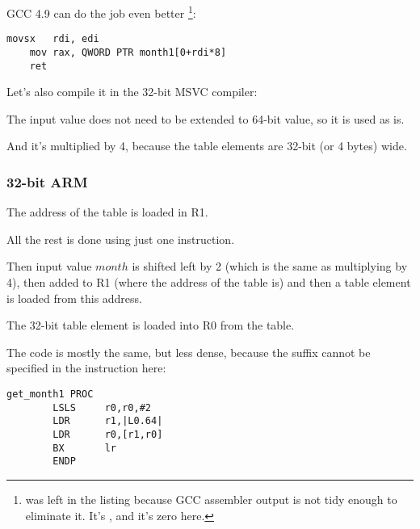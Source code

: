 \Optimizing GCC 4.9 can do the job even better
\footnote{ was left in the listing because GCC assembler output is not tidy enough to eliminate it.
It's , and it's zero here.}:

\begin{lstlisting}[caption=\Optimizing GCC 4.9 x64,style=customasmx86]
	movsx	rdi, edi
	mov	rax, QWORD PTR month1[0+rdi*8]
	ret
\end{lstlisting}


Let's also compile it in the 32-bit MSVC compiler:



The input value does not need to be extended to 64-bit value, so it is used as is.

And it's multiplied by 4, because the table elements are 32-bit (or 4 bytes) wide.

\subsubsection{32-bit ARM}





The address of the table is loaded in R1.

All the rest is done using just one \LDR instruction.

Then input value $month$ is shifted left by 2 (which is the same as multiplying by 4), then added
to R1 (where the address of the table is) and then a table element is loaded from this address.

The 32-bit table element is loaded into R0 from the table.


The code is mostly the same, but less dense, because the \LSL suffix cannot be specified in the \LDR instruction here:

\begin{lstlisting}[style=customasmARM]
get_month1 PROC
        LSLS     r0,r0,#2
        LDR      r1,|L0.64|
        LDR      r0,[r1,r0]
        BX       lr
        ENDP
\end{lstlisting}

